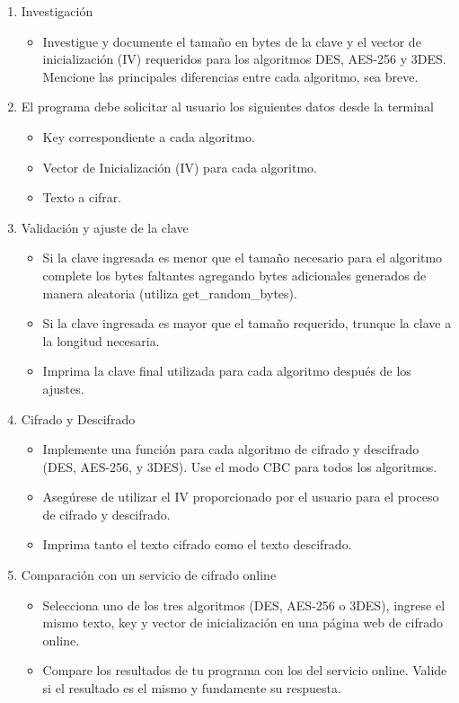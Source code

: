 \documentclass[letter,12pt]{article}
\begin{document}
\begin{enumerate}
    \item Investigación
    \begin{itemize}
        \item Investigue y documente el tamaño en bytes de la clave y el vector de inicialización (IV) requeridos para los algoritmos DES, AES-256 y 3DES. Mencione las principales diferencias entre cada algoritmo, sea breve.
    \end{itemize}

    \item El programa debe solicitar al usuario los siguientes datos desde la terminal
    \begin{itemize}
        \item Key correspondiente a cada algoritmo.
        \item Vector de Inicialización (IV) para cada algoritmo.
        \item Texto a cifrar.
    \end{itemize}

    \item Validación y ajuste de la clave
    \begin{itemize}
        \item Si la clave ingresada es menor que el tamaño necesario para el algoritmo complete los bytes faltantes agregando bytes adicionales generados de manera aleatoria (utiliza get\_random\_bytes).
        \item Si la clave ingresada es mayor que el tamaño requerido, trunque la clave a la longitud necesaria.
        \item Imprima la clave final utilizada para cada algoritmo después de los ajustes.
    \end{itemize}

    \item Cifrado y Descifrado
    \begin{itemize}
        \item Implemente una función para cada algoritmo de cifrado y descifrado (DES, AES-256, y 3DES). Use el modo CBC para todos los algoritmos.
        \item Asegúrese de utilizar el IV proporcionado por el usuario para el proceso de cifrado y descifrado.
        \item Imprima tanto el texto cifrado como el texto descifrado.
    \end{itemize}

    \item Comparación con un servicio de cifrado online
    \begin{itemize}
        \item Selecciona uno de los tres algoritmos (DES, AES-256 o 3DES), ingrese el mismo texto, key y vector de inicialización en una página web de cifrado online.
        \item Compare los resultados de tu programa con los del servicio online. Valide si el resultado es el mismo y fundamente su respuesta.
    \end{itemize}


\end{enumerate}
\end{document}
